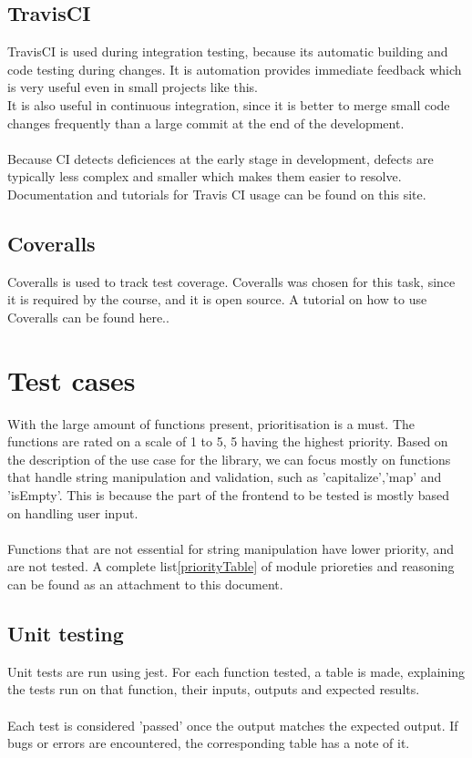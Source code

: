 \documentclass[a4paper, 12pt]{article}
\begin{document}
    \subsection{TravisCI}
    
    TravisCI\cite{Travis} is used during integration testing, because its automatic building and code testing during changes. It is automation provides immediate feedback which 
    is very useful even in small projects like this.
    \\
     It is also useful in continuous integration, since it is better to merge small code changes frequently than a large commit at 
    the end of the development.
    \\
    \\
     Because CI detects deficiences at the early stage in development, defects are typically less complex and smaller which makes them easier to resolve.
    Documentation and tutorials for Travis CI usage can be found on this site. \cite{TravisTutorial}

    \subsection{Coveralls}

    Coveralls\cite{coveralls} is used to track test coverage. Coveralls was chosen for this task, since it is required by the course, and it is open source. 
    A tutorial on how to use Coveralls can be found here.\cite{coverallsTutorial}.

\section{Test cases}

With the large amount of functions present, prioritisation is a must. The functions are rated on a scale of 1 to 5, 5 having the highest priority.
Based on the description of the use case for the library, we can focus mostly on functions that handle string manipulation and validation,
such as 'capitalize','map' and 'isEmpty'. This is because the part of the frontend to be tested  is mostly based on handling user input.
\\\\
Functions that are not essential for string manipulation have lower priority, and are not tested.
A complete list\ref{priorityTable} of module prioreties and reasoning can be found as an attachment to this document.


    \subsection{Unit testing}
    Unit tests are run using jest. For each function tested, a table is made, explaining the tests run on that function,
    their inputs, outputs and expected results. 
    \\\\
    Each test is considered 'passed' once the output matches the expected output. 
    If bugs or errors are encountered, the corresponding table has a note of it.
    \newpage
\end{document}
